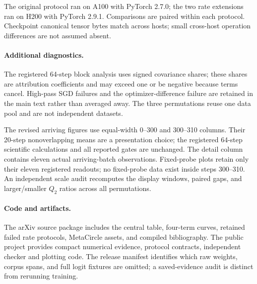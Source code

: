 The original protocol ran on A100 with PyTorch 2.7.0; the two rate extensions ran on H200 with PyTorch 2.9.1.  Comparisons are paired within each protocol.  Checkpoint canonical tensor bytes match across hosts; small cross-host operation differences are not assumed absent.

\paragraph{Additional diagnostics.}
The registered 64-step block analysis uses signed covariance shares; these shares are attribution coefficients and may exceed one or be negative because terms cancel.  High-pass SGD failures and the optimizer-difference failure are retained in the main text rather than averaged away.  The three permutations reuse one data pool and are not independent datasets.

The revised arriving figures use equal-width 0--300 and 300--310 columns.  Their 20-step nonoverlapping means are a presentation choice; the registered 64-step scientific calculations and all reported gates are unchanged.  The detail column contains eleven actual arriving-batch observations.  Fixed-probe plots retain only their eleven registered readouts; no fixed-probe data exist inside steps 300--310.  An independent scale audit recomputes the display windows, paired gaps, and larger/smaller $Q_2$ ratios across all permutations.

\paragraph{Code and artifacts.}
The arXiv source package includes the central table, four-term curves, retained failed rate protocols, MetaCircle assets, and compiled bibliography.  The public project provides compact numerical evidence, protocol contracts, independent checker and plotting code.  The release manifest identifies which raw weights, corpus spans, and full logit fixtures are omitted; a saved-evidence audit is distinct from rerunning training.

